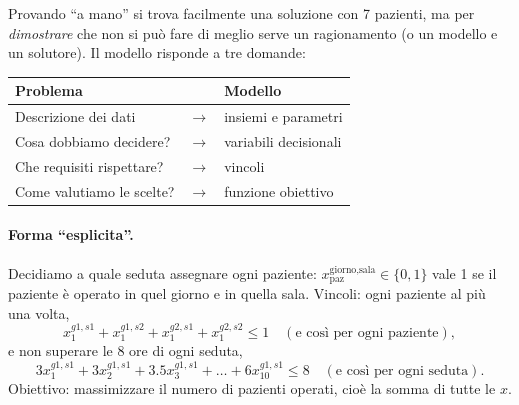 Provando ``a mano'' si trova facilmente una soluzione con 7 pazienti, ma per \emph{dimostrare} che non si può fare di meglio serve un ragionamento (o un modello e un solutore). Il modello risponde a tre domande:
\begin{center}
\begin{tabular}{@{}lcl@{}}
\toprule
\textbf{Problema} & & \textbf{Modello}\\ \midrule
Descrizione dei dati & $\to$ & insiemi e parametri\\
Cosa dobbiamo decidere? & $\to$ & variabili decisionali\\
Che requisiti rispettare? & $\to$ & vincoli\\
Come valutiamo le scelte? & $\to$ & funzione obiettivo\\
\bottomrule
\end{tabular}
\end{center}

\paragraph{Forma ``esplicita''.} Decidiamo a quale seduta assegnare ogni paziente: $x_{\text{paz}}^{\text{giorno,sala}}\in\{0,1\}$ vale 1 se il paziente è operato in quel giorno e in quella sala. Vincoli: ogni paziente al più una volta,
\[ x_{1}^{g1,s1}+x_{1}^{g1,s2}+x_{1}^{g2,s1}+x_{1}^{g2,s2}\le 1 \quad(\text{e così per ogni paziente}),\]
e non superare le 8 ore di ogni seduta,
\[ 3x_1^{g1,s1}+3x_2^{g1,s1}+3.5x_3^{g1,s1}+\dots+6x_{10}^{g1,s1}\le 8 \quad(\text{e così per ogni seduta}).\]
Obiettivo: massimizzare il numero di pazienti operati, cioè la somma di tutte le $x$.

